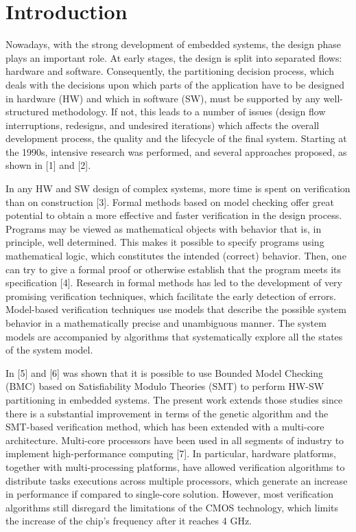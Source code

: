 \section{Introduction}
Nowadays, with the strong development of embedded systems, the design phase plays an important role. At early stages, the design is split into separated flows: hardware and software. Consequently, the partitioning decision process, which deals with the decisions upon which parts of the application have to be designed in hardware (HW) and which in software (SW), must be supported by any well-structured methodology. If not, this leads to a number of issues (design flow interruptions, redesigns, and undesired iterations) which affects the overall development process, the quality and the lifecycle of the final system. Starting at the 1990s, intensive research was performed, and several approaches proposed, as shown in [1] and [2].

In any HW and SW design of complex systems, more time is spent on verification than on construction [3]. Formal methods based on model checking offer great potential to obtain a more effective and faster verification in the design process. Programs may be viewed as mathematical objects with behavior that is, in principle, well determined. This makes it possible to specify programs using mathematical logic, which constitutes the intended (correct) behavior. Then, one can try to give a formal proof or otherwise establish that the program meets its specification [4]. Research in formal methods has led to the development of very promising verification techniques, which facilitate the early detection of errors. Model-based verification techniques use models that describe the possible system behavior in a mathematically precise and unambiguous manner. The system models are accompanied by algorithms that systematically explore all the states of the system model.

In [5] and [6] was shown that it is possible to use Bounded Model Checking (BMC) based on Satisfiability Modulo Theories (SMT) to perform HW-SW partitioning in embedded systems. The present work extends those studies since there is a substantial improvement in terms of the genetic algorithm and the SMT-based verification method, which has been extended with a multi-core architecture. Multi-core processors have been used in all segments of industry to implement high-performance computing [7]. In particular, hardware platforms, together with multi-processing platforms, have allowed verification algorithms to distribute tasks executions across multiple processors, which generate an increase in performance if compared to single-core solution. However, most verification algorithms still disregard the limitations of the CMOS technology, which limits the increase of the chip’s frequency after it reaches 4 GHz.

